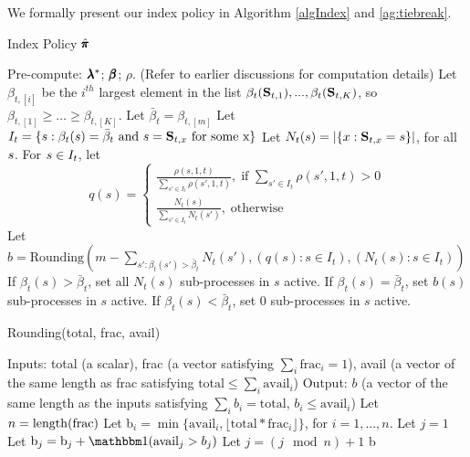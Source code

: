 We formally present our index policy in Algorithm \ref{algIndex} and \ref{ag:tiebreak}. 
\begin{algorithm}
\caption{Index Policy $\hat{\pmb{\pi}}$}
\label{algIndex}
\begin{algorithmic}
\STATE Pre-compute: $\pmb{\lambda}^*$; $\pmb{\beta}$; $\rho$. (Refer to earlier discussions for computation details) 
    \STATE Let $\beta_{t,[i]}$ be the $i^{th}$ largest element in the list $\beta_t(\mathbf{S}_{t,1}),...,\beta_t(\mathbf{S}_{t,K})$, so $\beta_{t,[1]}\geq\ldots\geq \beta_{t,[K]}$. 
    \STATE Let $\bar{\beta}_t = \beta_{t,[m]}$
    \STATE Let $I_t=\{s : \beta_t(s)=\bar{\beta}_t\ \text{and}\ s=\mathbf{S}_{t,x}\ \text{for some x}\}$
    \STATE Let $N_t(s) = |\{x:\mathbf{S}_{t,x}=s\}|$, for all $s$.
    \STATE For $s\in I_t$, let 
    $$
    q(s) = 
    \begin{cases}
	\frac{\rho(s,1,t)}{\sum_{s'\in I_t}\rho(s',1,t)}, \; \text{if } \sum_{s'\in I_t}\rho(s',1,t)>0\\
	\frac{N_t(s)}{\sum_{s'\in I_t} N_t(s')}, \; \text{otherwise}
    \end{cases}
    $$
    Let $b = \mathrm{Rounding}(m-\sum_{s':\beta_t(s')>\bar{\beta}_t}N_t(s'),
    (q(s):s\in I_t),(N_t(s):s\in I_t))$
    \STATE If $\beta_t(s)>\bar{\beta}_t$, set all $N_t(s)$ sub-processes in $s$ active.
    \STATE If $\beta_t(s)= \bar{\beta}_t$, set $b(s)$ sub-processes in $s$ active.
    \STATE If $\beta_t(s)< \bar{\beta}_t$, set 0 sub-processes in $s$ active.
    \ENDFOR
  \ENDFOR
\end{algorithmic}
\end{algorithm}

\begin{algorithm}
\caption{Rounding(total, frac, avail)}
\label{ag:tiebreak}
\begin{algorithmic}
\STATE Inputs: total (a scalar), frac (a vector satisfying $\sum_i \text{frac}_i = 1$), avail (a vector of the same length as frac satisfying $\text{total} \le \sum_i \text{avail}_i$)
\STATE Output: $b$ (a vector of the same length as the inputs satisfying $\sum_i b_i = \text{total}$, $b_i \le \text{avail}_i$)
\STATE Let $n  =  \mathrm{length}(\text{frac})$
\STATE Let b$_i = \min\{\text{avail}_i, \lfloor \text{total}*\text{frac}_i\rfloor\}$, for $i = 1,...,n$.
\STATE Let $j = 1$
\STATE Let $\text{b}_{j} = \text{b}_{j} + \ind{\text{avail}_{j}> b_j}$
\STATE Let $j = (j \mod n) +1$ 
\ENDWHILE
\RETURN b
\end{algorithmic}
\end{algorithm}


